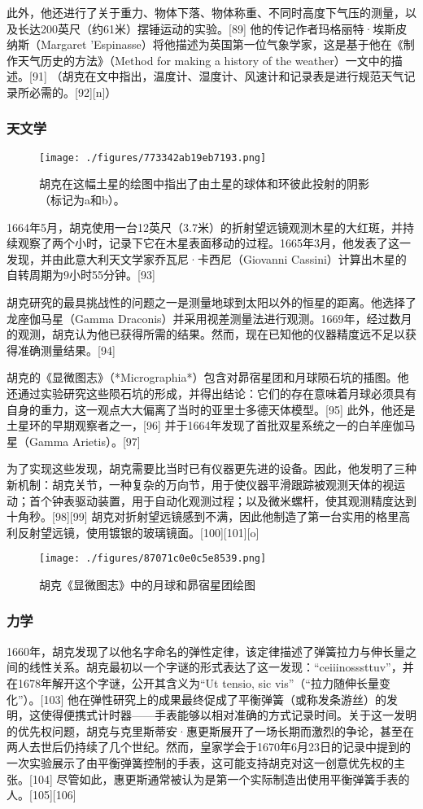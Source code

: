此外，他还进行了关于重力、物体下落、物体称重、不同时高度下气压的测量，以及长达200英尺（约61米）摆锤运动的实验。[89] 他的传记作者玛格丽特·埃斯皮纳斯（Margaret 'Espinasse）将他描述为英国第一位气象学家，这是基于他在《制作天气历史的方法》（Method for making a history of the weather）一文中的描述。[91] （胡克在文中指出，温度计、湿度计、风速计和记录表是进行规范天气记录所必需的。[92][n]）
\subsubsection{天文学}
\begin{figure}[ht]
\centering
\texttt{[image: ./figures/773342ab19eb7193.png]}
\caption{胡克在这幅土星的绘图中指出了由土星的球体和环彼此投射的阴影（标记为a和b）。} \label{fig_HK_4}
\end{figure}
1664年5月，胡克使用一台12英尺（3.7米）的折射望远镜观测木星的大红斑，并持续观察了两个小时，记录下它在木星表面移动的过程。1665年3月，他发表了这一发现，并由此意大利天文学家乔瓦尼·卡西尼（Giovanni Cassini）计算出木星的自转周期为9小时55分钟。[93]

胡克研究的最具挑战性的问题之一是测量地球到太阳以外的恒星的距离。他选择了龙座伽马星（Gamma Draconis）并采用视差测量法进行观测。1669年，经过数月的观测，胡克认为他已获得所需的结果。然而，现在已知他的仪器精度远不足以获得准确测量结果。[94]  

胡克的《显微图志》（*Micrographia*）包含对昴宿星团和月球陨石坑的插图。他还通过实验研究这些陨石坑的形成，并得出结论：它们的存在意味着月球必须具有自身的重力，这一观点大大偏离了当时的亚里士多德天体模型。[95] 此外，他还是土星环的早期观察者之一，[96] 并于1664年发现了首批双星系统之一的白羊座伽马星（Gamma Arietis）。[97]  

为了实现这些发现，胡克需要比当时已有仪器更先进的设备。因此，他发明了三种新机制：胡克关节，一种复杂的万向节，用于使仪器平滑跟踪被观测天体的视运动；首个钟表驱动装置，用于自动化观测过程；以及微米螺杆，使其观测精度达到十角秒。[98][99] 胡克对折射望远镜感到不满，因此他制造了第一台实用的格里高利反射望远镜，使用镀银的玻璃镜面。[100][101][o]
\begin{figure}[ht]
\centering
\texttt{[image: ./figures/87071c0e0c5e8539.png]}
\caption{胡克《显微图志》中的月球和昴宿星团绘图} \label{fig_HK_5}
\end{figure}
\subsubsection{力学}
1660年，胡克发现了以他名字命名的弹性定律，该定律描述了弹簧拉力与伸长量之间的线性关系。胡克最初以一个字谜的形式表达了这一发现：“ceiiinosssttuv”，并在1678年解开这个字谜，公开其含义为“Ut tensio, sic vis”（“拉力随伸长量变化”）。[103] 他在弹性研究上的成果最终促成了平衡弹簧（或称发条游丝）的发明，这使得便携式计时器——手表能够以相对准确的方式记录时间。关于这一发明的优先权问题，胡克与克里斯蒂安·惠更斯展开了一场长期而激烈的争论，甚至在两人去世后仍持续了几个世纪。然而，皇家学会于1670年6月23日的记录中提到的一次实验展示了由平衡弹簧控制的手表，这可能支持胡克对这一创意优先权的主张。[104] 尽管如此，惠更斯通常被认为是第一个实际制造出使用平衡弹簧手表的人。[105][106]

